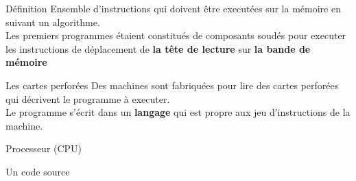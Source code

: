 \begin{frame}{Définition}
    Ensemble d'instructions qui doivent être executées sur la mémoire en suivant un algorithme. \\
    \newline
    Les premiers programmes étaient constitués de composants soudés pour executer les instructions de déplacement de \textbf{la tête de lecture} sur \textbf{la bande de mémoire}
\end{frame}

\begin{frame}{Les cartes perforées}
    Des machines sont fabriquées pour lire des cartes perforées qui décrivent le programme à executer. \\
    Le programme s'écrit dans un \textbf{langage} qui est propre aux jeu d'instructions de la machine.
\end{frame}

\begin{frame}{Processeur (CPU)}
\end{frame}

\begin{frame}{Un code source}
\end{frame}
